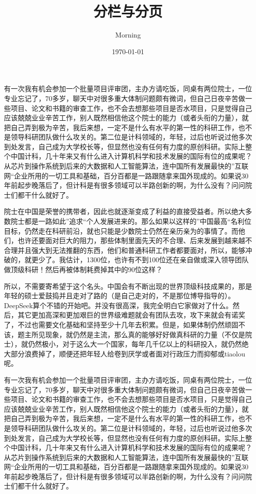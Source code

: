 \documentclass[12pt,twocolumn]{article}
\title{分栏与分页}
\author{Morning}
\date{\today}
\begin{document}
\maketitle
有一次我有机会参加一个批量项目评审团，主办方请吃饭，同桌有两位院士，一位专业忘记了，70多岁，聊天中对很多重大体制问题颇有微词，但自己日夜辛苦做一些项目、论文和书籍的审查工作，也不会去想那些项目是否水项目，只是觉得自己应该兢兢业业辛苦工作，别人既然相信他这个院士的能力（或者头衔的力量），就把自己弄到极为辛苦，我后来想，一定不是什么有水平的第一性的科研工作，也不是领导科研团队做什么攻关的。第二位是计科领域的，年轻，过后也听说过他多次到处发言，自己成为大学校长等，但显然也没有任何有力度的原创科研。实际上整个中国计科，几十年来又有什么进入计算机科学和技术发展的国际有位的成果呢？从芯片到操作系统到后来的大数据和人工智能算法，连中国所有发展最快的”互联网“企业所用的一切工具和基础，百分百都是一路跟随拿来国外现成的。如果说30年前起步晚落后了，但计科是有很多领域可以半路创新的啊，为什么没有？问问院士们都干什么就好了。

院士在中国是荣誉的携带者，因此也就逐渐变成了利益的直接受益者。所以绝大多数院士都是一路如此”追求“个人发展进来的。那么如果以这样的”中国最高“名利位目标，仍然走在科研前沿，就也只能是少数院士仍然在亲历亲为的事情了。而他们，也许还要面对巨大的阻力，那些体制里面先天的不合理、后来发展到越来越不合理并且强大到无法推翻的东西，他们和普通科研工作者都要面对，所以，能够冲破的，就更少了。我估计，1300位，也许有不到100位还在亲自做或深入领导团队做顶级科研！然后再被体制耗费掉其中的90位这样？

所以，不需要寄希望于这个名头。中国会有不断出现的世界顶级科技成果的，那是年轻的硕士爱鼓捣并且走对了路的（是自己走对的，不是那位博导指导的）。DeepSeek算个不错的开始吧。并没有很高深，我完全明白它家做对了什么。然后，其它更加高深和更加艰巨的世界级难题就会有团队去攻，攻下来就会有诺奖了，不过也需要文化基础和坚持至少十几年去积累。但是，如果体制仍然顽固不该，题主所见现象，就仍然是主流，那么真的能够好好做真科研的力量（不仅是院士），就仍然极小，对于这么大一个国家，每年几千亿以上的科研投入，就仍然绝大部分浪费掉了，顺便还把年轻人给卷到厌学或者面对行政压力而抑郁或tiaolou呢。

有一次我有机会参加一个批量项目评审团，主办方请吃饭，同桌有两位院士，一位专业忘记了，70多岁，聊天中对很多重大体制问题颇有微词，但自己日夜辛苦做一些项目、论文和书籍的审查工作，也不会去想那些项目是否水项目，只是觉得自己应该兢兢业业辛苦工作，别人既然相信他这个院士的能力（或者头衔的力量），就把自己弄到极为辛苦，我后来想，一定不是什么有水平的第一性的科研工作，也不是领导科研团队做什么攻关的。第二位是计科领域的，年轻，过后也听说过他多次到处发言，自己成为大学校长等，但显然也没有任何有力度的原创科研。实际上整个中国计科，几十年来又有什么进入计算机科学和技术发展的国际有位的成果呢？从芯片到操作系统到后来的大数据和人工智能算法，连中国所有发展最快的”互联网“企业所用的一切工具和基础，百分百都是一路跟随拿来国外现成的。如果说30年前起步晚落后了，但计科是有很多领域可以半路创新的啊，为什么没有？问问院士们都干什么就好了。
\end{document}
